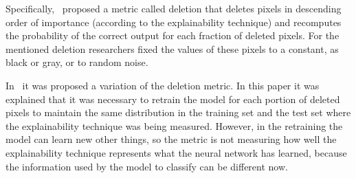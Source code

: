 \documentclass[preprint,12pt]{elsarticle}
\begin{document}
Specifically,~\cite{petsiukRISERandomizedInput} proposed a metric called deletion that deletes pixels in descending order of importance (according to the explainability technique) and recomputes the probability of the correct output for each fraction of deleted pixels. For the mentioned deletion researchers fixed the values of these pixels to a constant, as black or gray, or to random noise. 

In~\cite{hookerBenchmarkInterpretabilityMethods2019} it was proposed a variation of the deletion metric. In this paper it was explained that it was necessary to retrain the model for each portion of deleted pixels to maintain the same distribution in the training set and the test set where the explainability technique was being measured. However, in the retraining the model can learn new other things, so the metric is not measuring how well the explainability technique represents what the neural network has learned, because the information used by the model to classify can be different now.
\end{document}

